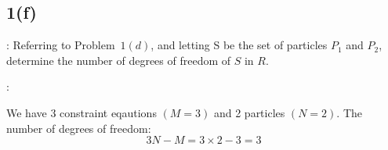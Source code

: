 \subsection{1(f)}
: Referring to Problem~$1(d)$, and letting S be the set of particles $P_1$ and $P_2$, determine the number of degrees of freedom of $S$ in $R$.

:

We have 3 constraint eqautions $(M=3)$ and 2 particles $(N=2)$. The number of degrees of freedom:
$$3N-M = 3 \times 2 - 3 = 3$$
